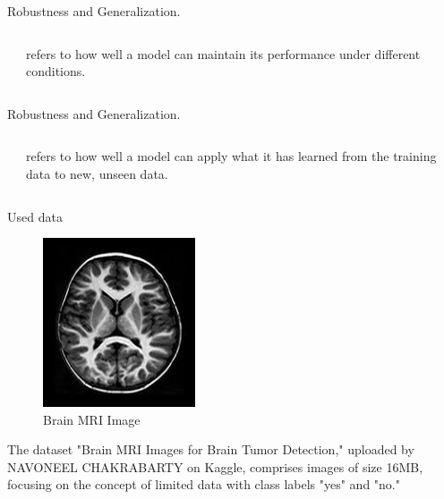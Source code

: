 \documentclass[aspectratio=169,xcolor=dvipsnames, t]{beamer}
\begin{document}
\begin{frame}{Robustness and Generalization.}
    \begin{columns}
    \begin{column}{0.45\textwidth}
       
    \end{column}
    \begin{column}{0.45\textwidth}  %
        refers to how well a model can maintain its performance under different conditions.
    \end{column}
    \end{columns}
\end{frame}
\begin{frame}{Robustness and Generalization.}
    \begin{columns}
    \begin{column}{0.45\textwidth}
       
    \end{column}
    \begin{column}{0.45\textwidth}  %
        refers to how well a model can apply what it has learned from the training data to new, unseen data.
    \end{column}
    \end{columns}
\end{frame}




\begin{frame}{Used data}
    \begin{figure}
    \centering
    \includegraphics[width=0.4\textwidth]{images/14 no.jpg}
    \caption{Brain MRI Image}
\end{figure}
The dataset "Brain MRI Images for Brain Tumor Detection," uploaded by NAVONEEL CHAKRABARTY on Kaggle, comprises images of size 16MB, focusing on the concept of limited data with class labels "yes" and "no." 

\end{frame}
\end{document}

